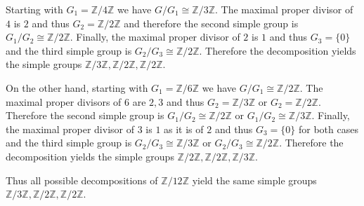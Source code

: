 \documentclass[a4paper,11pt,oneside]{article}
\begin{document}
{{            Starting with \(G_1 = \mathbb{Z}/4\mathbb{Z}\) we have \(G/G_1 \cong \mathbb{Z}/3\mathbb{Z}\). The maximal proper divisor of \(4\) is \(2\) and thus \(G_2 = \mathbb{Z}/2\mathbb{Z}\) and therefore the second simple group is \(G_1/G_2 \cong \mathbb{Z}/2\mathbb{Z}\). Finally, the maximal proper divisor of \(2\) is \(1\) and thus \(G_3 = \{0\}\) and the third simple group is \(G_2/G_3 \cong \mathbb{Z}/2\mathbb{Z}\). Therefore the decomposition yields the simple groups \(\mathbb{Z}/3\mathbb{Z}, \mathbb{Z}/2\mathbb{Z}, \mathbb{Z}/2\mathbb{Z}\).

            On the other hand, starting with \(G_1 = \mathbb{Z}/6\mathbb{Z}\) we have \(G/G_1 \cong \mathbb{Z}/2\mathbb{Z}\). The maximal proper divisors of \(6\) are \(2,3\) and thus \(G_2 = \mathbb{Z}/3\mathbb{Z}\) or \(G_2 = \mathbb{Z}/2\mathbb{Z}\). Therefore the second simple group is \(G_1/G_2 \cong \mathbb{Z}/2\mathbb{Z}\) or \(G_1/G_2 \cong \mathbb{Z}/3\mathbb{Z}\). Finally, the maximal proper divisor of \(3\) is \(1\) as it is of \(2\) and thus \(G_3 = \{0\}\) for both cases and the third simple group is \(G_2/G_3 \cong \mathbb{Z}/3\mathbb{Z}\) or \(G_2/G_3 \cong \mathbb{Z}/2\mathbb{Z}\). Therefore the decomposition yields the simple groups \(\mathbb{Z}/2\mathbb{Z}, \mathbb{Z}/2\mathbb{Z}, \mathbb{Z}/3\mathbb{Z}\).

            Thus all possible decompositions of \(\mathbb{Z}/12\mathbb{Z}\) yield the same simple groups \(\mathbb{Z}/3\mathbb{Z}, \mathbb{Z}/2\mathbb{Z}, \mathbb{Z}/2\mathbb{Z}\).
        }

    }
\end{document}
